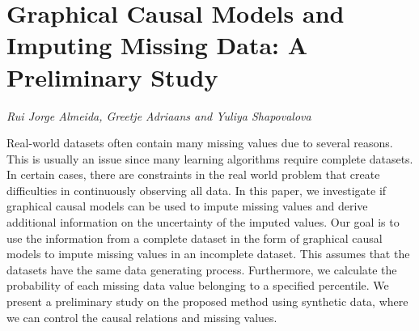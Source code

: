 \documentclass[../booklet.tex]{subfiles}
\begin{document}
\section[Graphical Causal Models and Imputing Missing Data: A Preliminary Study. {\it Rui Jorge Almeida, Greetje Adriaans and Yuliya Shapovalova}]{Graphical Causal Models and Imputing Missing Data: A Preliminary Study}
  

\begin{center}
  {\it Rui Jorge Almeida, Greetje Adriaans and Yuliya Shapovalova}
\end{center}

\vskip 0.8cm


Real-world datasets often contain many missing values due to several reasons. This is usually an issue since many learning algorithms require complete datasets. In certain cases, there are constraints in the real world problem that create difficulties in continuously observing all data. In this paper, we investigate if graphical causal models can be used to impute missing values and derive additional information on the uncertainty of the imputed values. Our goal is to use the information from a complete dataset in the form of graphical causal models to impute missing values in an incomplete dataset. This assumes that the datasets have the same data generating process. Furthermore, we calculate the probability of each missing data value belonging to a specified percentile. We present a preliminary study on the proposed method using synthetic data, where we can control the causal relations and missing values.
\end{document}
